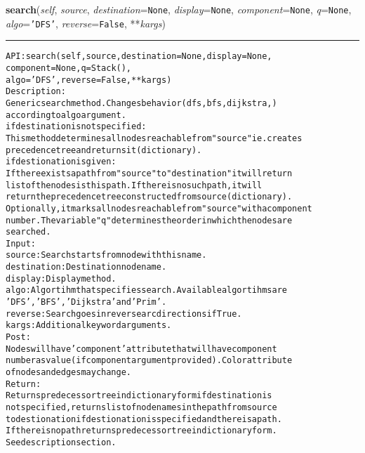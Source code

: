     \label{coinor:gimpy:graph:Graph:search}

    \vspace{0.5ex}

\hspace{.8\funcindent}\begin{boxedminipage}{\funcwidth}

    \raggedright \textbf{search}(\textit{self}, \textit{source}, \textit{destination}={\tt None}, \textit{display}={\tt None}, \textit{component}={\tt None}, \textit{q}={\tt None}, \textit{algo}={\tt \texttt{'}\texttt{DFS}\texttt{'}}, \textit{reverse}={\tt False}, **\textit{kargs})

    \vspace{-1.5ex}

    \rule{\textwidth}{0.5\fboxrule}
\setlength{\parskip}{2ex}
\begin{alltt}

API: search(self, source, destination = None, display = None,
       component = None, q = Stack(),
       algo = 'DFS', reverse = False, **kargs)
Description:
Generic search method. Changes behavior (dfs,bfs,dijkstra,)
according to algo argument.
if destination is not specified:
   This method determines all nodes reachable from "source" ie. creates
   precedence tree and returns it (dictionary).
if destionation is given:
   If there exists a path from "source" to "destination" it will return
   list of the nodes is this path. If there is no such path, it will
   return the precedence tree constructed from source (dictionary).
Optionally, it marks all nodes reachable from "source" with a component
number. The variable "q" determines the order in which the nodes are
searched.
Input:
    source: Search starts from node with this name.
    destination: Destination node name.
    display: Display method.
    algo: Algortihm that specifies search. Available algortihms are
    'DFS', 'BFS', 'Dijkstra' and 'Prim'.
    reverse: Search goes in reverse arc directions if True.
    kargs: Additional keyword arguments.
Post:
    Nodes will have 'component' attribute that will have component
    number as value (if component argument provided). Color attribute
    of nodes and edges may change.
Return:
    Returns predecessor tree in dictionary form if destination is
    not specified, returns list of node names in the path from source
    to destionation if destionation is specified and there is a path.
    If there is no path returns predecessor tree in dictionary form.
    See description section.
\end{alltt}

\setlength{\parskip}{1ex}
    \end{boxedminipage}

